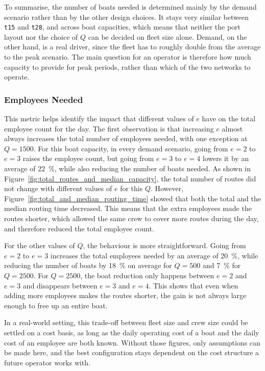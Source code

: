 \documentclass[12pt]{article}
\begin{document}
To summarise, the number of boats needed is determined mainly by the demand scenario rather than by the other design choices. It stays very similar between \texttt{t15} and \texttt{t28}, and across boat capacities, which means that neither the port layout nor the choice of \(Q\) can be decided on fleet size alone. Demand, on the other hand, is a real driver, since the fleet has to roughly double from the average to the peak scenario. The main question for an operator is therefore how much capacity to provide for peak periods, rather than which of the two networks to operate.

\subsubsection{Employees Needed}
\label{subsubsec:employees-needed}

This metric helps identify the impact that different values of \(e\) have on the total employee count for the day. The first observation is that increasing \(e\) almost always increases the total number of employees needed, with one exception at \(Q=1500\). For this boat capacity, in every demand scenario, going from \(e=2\) to \(e=3\) raises the employee count, but going from \(e=3\) to \(e=4\) lowers it by an average of \qty{22}{\percent}, while also reducing the number of boats needed. As shown in Figure~\ref{fig:total_routes_and_median_capacity}, the total number of routes did not change with different values of \(e\) for this \(Q\). However, Figure~\ref{fig:total_and_median_routing_time} showed that both the total and the median routing time decreased. This means that the extra employees made the routes shorter, which allowed the same crew to cover more routes during the day, and therefore reduced the total employee count.

For the other values of \(Q\), the behaviour is more straightforward. Going from \(e=2\) to \(e=3\) increases the total employees needed by an average of \qty{20}{\percent}, while reducing the number of boats by \qty{18}{\percent} on average for \(Q=500\) and \qty{7}{\percent} for \(Q=2500\). For \(Q=2500\), the boat reduction only happens between \(e=2\) and \(e=3\) and disappears between \(e=3\) and \(e=4\). This shows that even when adding more employees makes the routes shorter, the gain is not always large enough to free up an entire boat.

In a real-world setting, this trade-off between fleet size and crew size could be settled on a cost basis, as long as the daily operating cost of a boat and the daily cost of an employee are both known. Without those figures, only assumptions can be made here, and the best configuration stays dependent on the cost structure a future operator works with.
\end{document}

